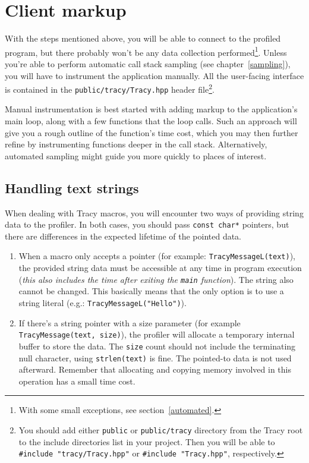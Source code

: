 \documentclass[hidelinks,titlepage,a4paper]{article}
\begin{document}
\section{Client markup}
\label{client}

With the steps mentioned above, you will be able to connect to the profiled program, but there probably won't be any data collection performed\footnote{With some small exceptions, see section~\ref{automated}.}. Unless you're able to perform automatic call stack sampling (see chapter~\ref{sampling}), you will have to instrument the application manually. All the user-facing interface is contained in the \texttt{public/tracy/Tracy.hpp} header file\footnote{You should add either \texttt{public} or \texttt{public/tracy} directory from the Tracy root to the include directories list in your project. Then you will be able to \texttt{\#include "tracy/Tracy.hpp"} or \texttt{\#include "Tracy.hpp"}, respectively.}.

Manual instrumentation is best started with adding markup to the application's main loop, along with a few functions that the loop calls. Such an approach will give you a rough outline of the function's time cost, which you may then further refine by instrumenting functions deeper in the call stack. Alternatively, automated sampling might guide you more quickly to places of interest.

\subsection{Handling text strings}
\label{textstrings}

When dealing with Tracy macros, you will encounter two ways of providing string data to the profiler. In both cases, you should pass \texttt{const char*} pointers, but there are differences in the expected lifetime of the pointed data.

\begin{enumerate}
\item When a macro only accepts a pointer (for example: \texttt{TracyMessageL(text)}), the provided string data must be accessible at any time in program execution (\emph{this also includes the time after exiting the \texttt{main} function}). The string also cannot be changed. This basically means that the only option is to use a string literal (e.g.: \texttt{TracyMessageL("Hello")}).

\item If there's a string pointer with a size parameter (for example \texttt{TracyMessage(text, size)}), the profiler will allocate a temporary internal buffer to store the data. The \texttt{size} count should not include the terminating null character, using \texttt{strlen(text)} is fine. The pointed-to data is not used afterward. Remember that allocating and copying memory involved in this operation has a small time cost.
\end{enumerate}
\end{document}
